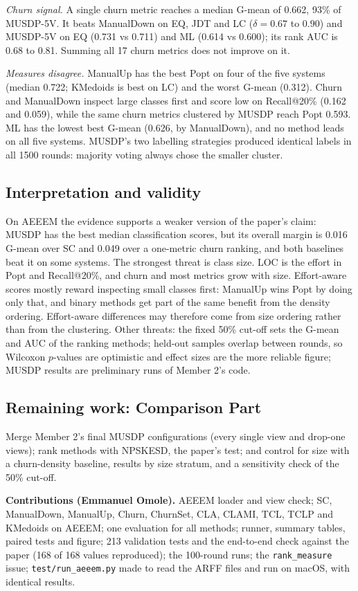 \emph{Churn signal.} A single churn metric reaches a median G-mean of 0.662,
93\% of MUSDP-5V. It beats ManualDown on EQ, JDT and LC ($\delta=0.67$ to
$0.90$) and MUSDP-5V on EQ (0.731 vs 0.711) and ML (0.614 vs 0.600); its rank
AUC is 0.68 to 0.81. Summing all 17 churn metrics does not improve on it.

\emph{Measures disagree.} ManualUp has the best Popt on four of the five
systems (median 0.722; KMedoids is best on LC) and the worst G-mean (0.312). Churn and ManualDown inspect large classes
first and score low on Recall@20\% (0.162 and 0.059), while the same churn
metrics clustered by MUSDP reach Popt 0.593. ML has the lowest best G-mean
(0.626, by ManualDown), and no method leads on all five systems. MUSDP's two
labelling strategies produced identical labels in all 1500 rounds: majority
voting always chose the smaller cluster.

\subsection{Interpretation and validity}

On AEEEM the evidence supports a weaker version of the paper's claim: MUSDP
has the best median classification scores, but its overall margin is 0.016
G-mean over SC and 0.049 over a one-metric churn ranking, and both baselines
beat it on some systems. The strongest threat is class size. LOC is the effort
in Popt and Recall@20\%, and churn and most metrics grow with size.
Effort-aware scores mostly reward inspecting small classes first: ManualUp
wins Popt by doing only that, and binary methods get part of the same benefit
from the density ordering. Effort-aware differences may therefore come from
size ordering rather than from the clustering. Other threats: the fixed 50\%
cut-off sets the G-mean and AUC of the ranking methods; held-out samples
overlap between rounds, so Wilcoxon $p$-values are optimistic and effect sizes
are the more reliable figure; MUSDP results are preliminary runs of Member 2's
code.

\subsection{Remaining work: Comparison Part}

Merge Member 2's final MUSDP configurations (every single view and drop-one
views); rank methods with NPSKESD, the paper's test; and control for size with
a churn-density baseline, results by size stratum, and a sensitivity check of
the 50\% cut-off.

\textbf{Contributions (Emmanuel Omole).} AEEEM loader and view check; SC,
ManualDown, ManualUp, Churn, ChurnSet, CLA, CLAMI, TCL, TCLP and KMedoids on
AEEEM; one evaluation for all
methods; runner, summary tables, paired tests and figure; 213 validation tests
and the end-to-end check against the paper (168 of 168 values reproduced); the 100-round runs; the
\texttt{rank\_measure} issue; \texttt{test/run\_aeeem.py} made to read the
ARFF files and run on macOS, with identical results.
